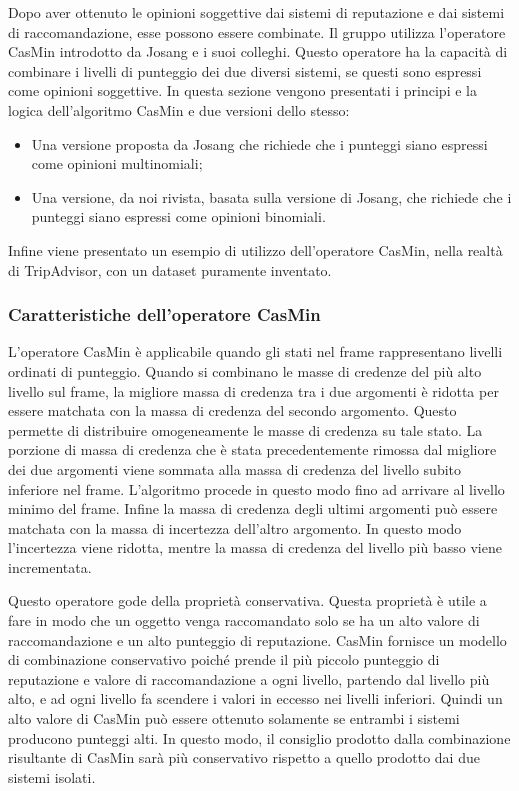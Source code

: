 \documentclass{report}
\begin{document}
	Dopo aver ottenuto le opinioni soggettive dai sistemi di reputazione e
	dai sistemi di raccomandazione, esse possono essere combinate. Il gruppo
	utilizza l'operatore CasMin introdotto da Josang e i suoi colleghi.
	Questo operatore ha la capacità di combinare i livelli di punteggio dei
	due diversi sistemi, se questi sono espressi come opinioni soggettive.
	In questa sezione vengono presentati i principi e la logica
	dell'algoritmo CasMin e due versioni dello stesso:
	
	\begin{itemize}
		\item
		Una versione proposta da Josang che richiede che i punteggi siano
		espressi come opinioni multinomiali;
		\item
		Una versione, da noi rivista, basata sulla versione di Josang, che
		richiede che i punteggi siano espressi come opinioni binomiali.
	\end{itemize}
	
	Infine viene presentato un esempio di utilizzo dell'operatore CasMin,
	nella realtà di TripAdvisor, con un dataset puramente inventato.
	
	\hypertarget{header-n146}{%
		\subsubsection{Caratteristiche dell'operatore
			CasMin}\label{header-n146}}
	
	L'operatore CasMin è applicabile quando gli stati nel frame
	rappresentano livelli ordinati di punteggio. Quando si combinano le
	masse di credenze del più alto livello sul frame, la migliore massa di
	credenza tra i due argomenti è ridotta per essere matchata con la massa
	di credenza del secondo argomento. Questo permette di distribuire
	omogeneamente le masse di credenza su tale stato. La porzione di massa
	di credenza che è stata precedentemente rimossa dal migliore dei due
	argomenti viene sommata alla massa di credenza del livello subito
	inferiore nel frame. L'algoritmo procede in questo modo fino ad arrivare
	al livello minimo del frame. Infine la massa di credenza degli ultimi
	argomenti può essere matchata con la massa di incertezza dell'altro
	argomento. In questo modo l'incertezza viene ridotta, mentre la massa di
	credenza del livello più basso viene incrementata.
	
	Questo operatore gode della proprietà conservativa. Questa proprietà è
	utile a fare in modo che un oggetto venga raccomandato solo se ha un
	alto valore di raccomandazione e un alto punteggio di reputazione.
	CasMin fornisce un modello di combinazione conservativo poiché prende il
	più piccolo punteggio di reputazione e valore di raccomandazione a ogni
	livello, partendo dal livello più alto, e ad ogni livello fa scendere i
	valori in eccesso nei livelli inferiori. Quindi un alto valore di CasMin
	può essere ottenuto solamente se entrambi i sistemi producono punteggi
	alti. In questo modo, il consiglio prodotto dalla combinazione
	risultante di CasMin sarà più conservativo rispetto a quello prodotto
	dai due sistemi isolati.
	
\end{document}
